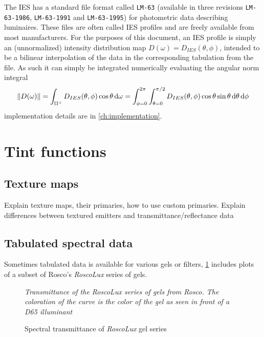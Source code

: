 The \gls{IES} has a standard file format called \texttt{LM-63} (available in
three revisions \texttt{LM-63-1986}, \texttt{LM-63-1991} and
\texttt{LM-63-1995}) for photometric data describing luminaires. These files
are often called \gls{IES} profiles and are freely available from most
manufacturers. For the purposes of this document, an \gls{IES} profile
is simply an (unnormalized) intensity distribution map $D(\omega) =
D_{IES}(\theta,\phi)$, intended to be a bilinear interpolation of the data in
the corresponding tabulation from the file. As such it can simply be integrated
numerically evaluating the angular norm integral
\begin{equation}
\|D(\omega)\|
   = \int_{\Omega^+}  D_{IES}(\theta,\phi) \cos\theta \d\omega
   = \int_{\phi = 0}^{2\pi} \int_{\theta = 0}^{\pi/2}
        D_{IES}(\theta,\phi) \cos\theta \sin\theta \d\theta \d\phi
\end{equation}
implementation details are in \cref{ch:implementation}.

\section{Tint functions}

\subsection{Texture maps}

\begin{inconstruction}
Explain texture maps, their primaries, how to use custom primaries.
Explain differences between textured emitters and transmittance/reflectance data
\end{inconstruction}

\subsection{Tabulated spectral data}
Sometimes tabulated data is available for various gels or filters, \cref{fig:roscolux}
includes plots of a subset of Rosco's \emph{RoscoLux} series of gels.

\begin{figure}
{
\centering
\noindent{}
\caption{Spectral transmittance of \emph{RoscoLux} gel series}
\label{fig:roscolux}
}
\vskip 1mm
{\footnotesize\it Transmittance of the \emph{RoscoLux} series of gels from
Rosco. The coloration of the curve is the color of the gel as seen in front
of a D65 illuminant}
\end{figure}


